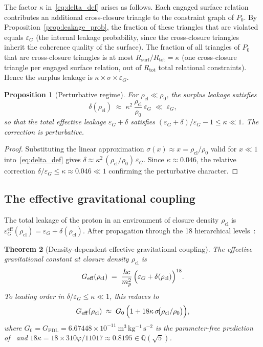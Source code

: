 \documentclass[11pt,a4paper]{article}
\newtheorem{theorem}{Theorem}[section]
\newtheorem{proposition}[theorem]{Proposition}
\theoremstyle{definition}
\newcommand{\Rsurf}{R_{\mathrm{surf}}}
\newcommand{\Rtot}{R_{\mathrm{tot}}}
\newcommand{\epsg}{\varepsilon_G}
\newcommand{\GPDL}{G_{\mathrm{PDL}}}
\newcommand{\Geff}{G_{\mathrm{eff}}}
\newcommand{\Gzero}{G_0}
\newcommand{\vp}{\varphi}
\newcommand{\kap}{\kappa}
\newcommand{\sig}{\sigma}
\newcommand{\rhocl}{\rho_{\mathrm{cl}}}
\newcommand{\rhoO}{\rho_0}
\begin{document}
The factor $\kap$ in~\eqref{eq:delta_def} arises as follows. Each engaged surface relation contributes an additional cross-closure triangle to the constraint graph of $P_0$. By Proposition~\ref{prop:leakage_prob}, the fraction of these triangles that are violated equals $\epsg$ (the internal leakage probability, since the cross-closure triangles inherit the coherence quality of the surface). The fraction of all triangles of $P_0$ that are cross-closure triangles is at most $\Rsurf/\Rtot = \kap$ (one cross-closure triangle per engaged surface relation, out of $\Rtot$ total relational constraints). Hence the surplus leakage is $\kap \times \sig \times \epsg$.

\begin{proposition}[Perturbative regime]
\label{prop:perturbative}
For $\rhocl \ll \rhoO$, the surplus leakage satisfies
\begin{equation}
  \label{eq:delta_perturbative}
  \delta(\rhocl) \;\approx\; \kap^2\,\frac{\rhocl}{\rhoO}\,\epsg \;\ll\; \epsg,
\end{equation}
so that the total effective leakage $\epsg + \delta$ satisfies $(\epsg+\delta)/\epsg - 1 \leq \kap \ll 1$. The correction is perturbative.
\end{proposition}

\begin{proof}
Substituting the linear approximation $\sig(x) \approx x = \rhocl/\rhoO$ valid for $x \ll 1$ into~\eqref{eq:delta_def} gives $\delta \approx \kap^2\,(\rhocl/\rhoO)\,\epsg$. Since $\kap \approx 0.046$, the relative correction $\delta/\epsg \leq \kap \approx 0.046 \ll 1$ confirming the perturbative character.
\end{proof}

\subsection{The effective gravitational coupling}
\label{subsec:Geff_formula}

The total leakage of the proton in an environment of closure density $\rhocl$ is $\epsg^{\mathrm{eff}}(\rhocl) = \epsg + \delta(\rhocl)$. After propagation through the 18 hierarchical levels~\cite{Topology_18_PDL_2026,PDL_Bridge_2026}:

\begin{theorem}[Density-dependent effective gravitational coupling]
\label{thm:Geff}
The effective gravitational constant at closure density $\rhocl$ is
\begin{equation}
  \label{eq:Geff}
  \Geff(\rhocl) \;=\; \frac{\hbar c}{m_p^2}\,\Bigl(\epsg + \delta(\rhocl)\Bigr)^{18}.
\end{equation}
To leading order in $\delta/\epsg \leq \kap \ll 1$, this reduces to
\begin{equation}
  \label{eq:Geff_leading}
  \Geff(\rhocl) \;\approx\; \Gzero\,\Bigl(1 + 18\kap\,\sig\!\bigl(\rhocl/\rhoO\bigr)\Bigr),
\end{equation}
where $\Gzero = \GPDL = 6.67448 \times 10^{-11}\ \mathrm{m^3\,kg^{-1}\,s^{-2}}$ is the parameter-free prediction of~\cite{PDL_Bridge_2026} and $18\kap = 18 \times 310\vp/11017 \approx 0.8195 \in \mathbb{Q}(\sqrt{5})$.
\end{theorem}
\end{document}
